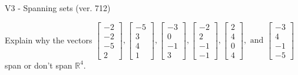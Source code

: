 \begin{exercise}
  \begin{exerciseTitle}V3 - Spanning sets (ver. 712)\end{exerciseTitle}
  \begin{exerciseStatement}
    Explain why the vectors \(\left[\begin{array}{r}
-2 \\
-2 \\
-5 \\
2
\end{array}\right] , \left[\begin{array}{r}
-5 \\
3 \\
4 \\
1
\end{array}\right] , \left[\begin{array}{r}
-3 \\
0 \\
-1 \\
3
\end{array}\right] , \left[\begin{array}{r}
-2 \\
2 \\
-1 \\
-1
\end{array}\right] , \left[\begin{array}{r}
2 \\
4 \\
0 \\
4
\end{array}\right] , \text{ and } \left[\begin{array}{r}
-3 \\
4 \\
-1 \\
-5
\end{array}\right]\) span or don't span \(\mathbb{R}^4\). 
	



\end{exerciseStatement}
\end{exercise}
